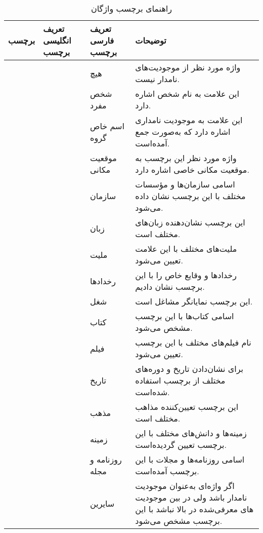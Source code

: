 \begin{table}
	\caption{راهنمای برچسب واژگان}
	\label{table.NER_tags}
	\begin{center}
		\small
		\begin{tabular}{|P{1.2cm}|P{2cm}|P{2cm}|P{8cm}|}
			\hline
			برچسب & تعریف انگلیسی برچسب & تعریف فارسی برچسب & توضیحات \\
			\hline
			 &  &
			هیچ & واژه مورد نظر از موجودیت‌های نامدار نیست. \\
			\hline
			 &  &
			شخص مفرد & این علامت به نام شخص اشاره دارد. \\
			\hline
			 &  &
			اسم خاص گروه & این علامت به موجودیت نامداری اشاره دارد که به‌صورت جمع آمده‌است.\\
			\hline
			 &  &
			موقعیت مکانی & واژه مورد نظر این برچسب به موقعیت مکانی خاصی اشاره دارد. \\
			\hline
			 &  &
			سازمان  & اسامی سازمان‌­ها و مؤسسات مختلف با این برچسب نشان داده می‌­شود. \\
			\hline
			 &  &
			زبان & این برچسب نشان‌دهنده زبان‌­های مختلف است. \\
			\hline
			 &  &
			ملیت & ملیت­‌های مختلف با این علامت تعیین می‌­شود. \\
			\hline
			 &  &
			رخدادها & رخدادها و وقایع خاص را با این برچسب نشان دادیم. \\
			\hline
			 &  &
			شغل & این برچسب نمایانگر مشاغل است. \\
			\hline
			 &  &
			کتاب & اسامی کتاب‌­ها با این برچسب مشخص می‌شود. \\
			\hline
			 &  &
			فیلم & نام فیلم‌­های مختلف با این برچسب تعیین می‌­شود. \\
			\hline
			 &  &
			تاریخ & برای نشان‌دادن تاریخ و دوره‌های مختلف از برچسب استفاده شده‌است. \\
			\hline
			 &  &
			مذهب & این برچسب تعیین‌کننده مذاهب مختلف است. \\
			\hline
			 &  &
			زمینه & زمینه‌ها و دانش‌­های مختلف با این برچسب تعیین گردیده‌است. \\
			\hline
			 &  &
			روزنامه و مجله & اسامی روزنامه‌ها و مجلات با این برچسب آمده‌است. \\
			\hline
			 &  &
			سایرین & اگر واژه‌ای به‌عنوان موجودیت نامدار باشد ولی در بین موجودیت­‌های معرفی‌شده در بالا نباشد با این برچسب مشخص می‌­شود. \\
			\hline
			
		\end{tabular}
	\end{center}
\end{table}



